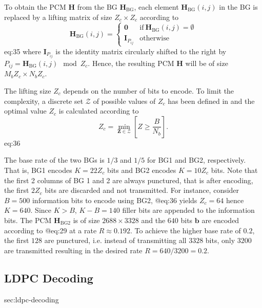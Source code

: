 \documentclass{article}
\def\0{\mathbf{0}}
\def\b{\mathbf{b}}
\def\H{\mathbf{H}}
\def\Hbg{\mathbf{H}_\mathrm{BG}}
\def\Hbgt{\mathbf{H}_\mathrm{BG2}}
\def\I{\mathbf{I}}
\def\Mb{{M_b}}
\def\Nb{{N_b}}
\def\Z{\mathbf{Z}}
\def\Zc{{Z_c}}
\begin{document}
To obtain the PCM $\H$ from the BG $\Hbg$, each element $\Hbg(i,j)$ in the BG is replaced by a lifting matrix of size $\Zc\times \Zc$ according to
\begin{equation}
  \Hbg(i,j) =
  \begin{cases}
    \0 & \textrm{if}~ \Hbg(i,j)=\emptyset \\
    \I_{P_{ij}} & \textrm{otherwise}
  \end{cases}
\end{equation} {eq:35}
where $\I_{P_{ij}}$ is the identity matrix circularly shifted to the right by $P_{ij} = \Hbg(i,j)\mod \Zc$. Hence, the resulting PCM $\H$ will be of size $\Mb\Zc\times\Nb\Zc$.

The lifting size $\Zc$ depends on the number of bits to encode. To limit the complexity, a discrete set $\mathcal{Z}$ of possible values of $\Zc$ has been defined in \cite{3gpp2017_38212} and the optimal value $\Zc$ is calculated according to
\begin{equation}
  \Zc = \min_{\Z\in\mathcal{Z}}\left[Z\geq\frac{B}{\Nb}\right].
\end{equation}{eq:36}

The base rate of the two BGs is $1/3$ and $1/5$ for BG1 and BG2, respectively. That is, BG1 encodes $K=22\Zc$ bits and BG2 encodes $K=10\Zc$ bits. Note that the first 2 columns of BG 1 and 2 are always punctured, that is after encoding, the first $2\Zc$ bits are discarded and not transmitted.
For instance, consider $B=500$ information bits to encode using BG2, @eq:36 yields $\Zc=64$ hence $K=640$. Since $K>B$, $K-B=140$ filler bits are appended to the information bits. The PCM $\Hbgt$ is of size $2688\times 3328$ and the $640$ bits $\b$ are encoded according to @eq:29 at a rate $R \approx 0.192$. To achieve the higher base rate of $0.2$, the first $128$ are punctured, i.e. instead of transmitting all $3328$ bits, only $3200$ are transmitted resulting in the desired rate $R=640/3200=0.2$.

\subsection{LDPC Decoding}{sec:ldpc-decoding}
\end{document}
